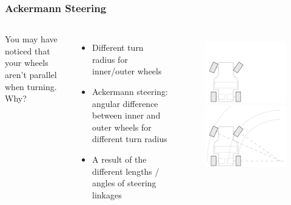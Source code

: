 \documentclass{beamer}
\begin{document}
\begin{frame}
\frametitle{Ackermann Steering}
\begin{columns}[t]
  You may have noticed that your wheels aren't parallel when turning. Why?
   {
  \begin{itemize}
    \item Different turn radius for inner/outer wheels
    \item Ackermann steering: angular difference between inner and outer wheels for different turn radius
    \item A result of the different lengths / angles of steering linkages
  \end{itemize}
  }
  \begin{figure}
    \centering
     {
    \includegraphics[width=1.0\columnwidth]{images-dis12/car-top-ackermann-nomarkings} \\
    }
     {
    \includegraphics[width=1.0\columnwidth]{images-dis12/car-top-ackermann} \\
    }
  \end{figure}
\end{columns}
\end{frame}
\end{document}
